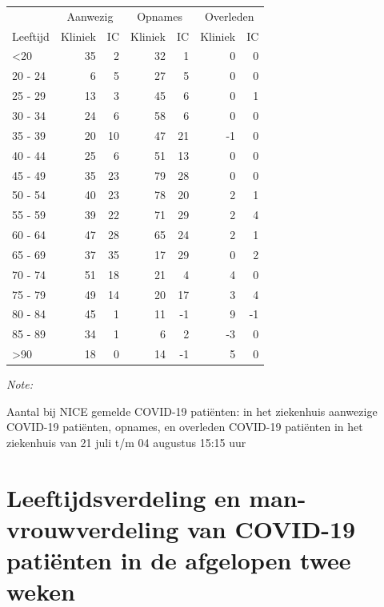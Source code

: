 \documentclass[
  english,
  man,floatsintext]{apa6}
\begin{document}
\begin{table}
\centering\begingroup\fontsize{10}{12}\selectfont

\begin{threeparttable}
\begin{tabular}{lrrrrrr}
\toprule
\multicolumn{1}{c}{ } & \multicolumn{2}{c}{Aanwezig} & \multicolumn{2}{c}{Opnames} & \multicolumn{2}{c}{Overleden} \\
\cmidrule(l{3pt}r{3pt}){2-3} \cmidrule(l{3pt}r{3pt}){4-5} \cmidrule(l{3pt}r{3pt}){6-7}
Leeftijd & Kliniek & IC & Kliniek & IC & Kliniek & IC\\
\midrule
<20 & 35 & 2 & 32 & 1 & 0 & 0\\
20 - 24 & 6 & 5 & 27 & 5 & 0 & 0\\
25 - 29 & 13 & 3 & 45 & 6 & 0 & 1\\
30 - 34 & 24 & 6 & 58 & 6 & 0 & 0\\
35 - 39 & 20 & 10 & 47 & 21 & -1 & 0\\
40 - 44 & 25 & 6 & 51 & 13 & 0 & 0\\
45 - 49 & 35 & 23 & 79 & 28 & 0 & 0\\
50 - 54 & 40 & 23 & 78 & 20 & 2 & 1\\
55 - 59 & 39 & 22 & 71 & 29 & 2 & 4\\
60 - 64 & 47 & 28 & 65 & 24 & 2 & 1\\
65 - 69 & 37 & 35 & 17 & 29 & 0 & 2\\
70 - 74 & 51 & 18 & 21 & 4 & 4 & 0\\
75 - 79 & 49 & 14 & 20 & 17 & 3 & 4\\
80 - 84 & 45 & 1 & 11 & -1 & 9 & -1\\
85 - 89 & 34 & 1 & 6 & 2 & -3 & 0\\
>90 & 18 & 0 & 14 & -1 & 5 & 0\\
\bottomrule
\end{tabular}
\begin{tablenotes}
\item \textit{Note: } 
\item Aantal bij NICE gemelde COVID-19 patiënten: in het ziekenhuis aanwezige COVID-19 patiënten, opnames, en overleden COVID-19 patiënten in het ziekenhuis van 21 juli t/m 04 augustus 15:15 uur
\end{tablenotes}
\end{threeparttable}
\endgroup{}
\end{table}

\newpage

\hypertarget{leeftijdsverdeling-en-man-vrouwverdeling-van-covid-19-patiuxebnten-in-de-afgelopen-twee-weken}{%
\section{Leeftijdsverdeling en man-vrouwverdeling van COVID-19 patiënten in de afgelopen twee weken}\label{leeftijdsverdeling-en-man-vrouwverdeling-van-covid-19-patiuxebnten-in-de-afgelopen-twee-weken}}
\end{document}
